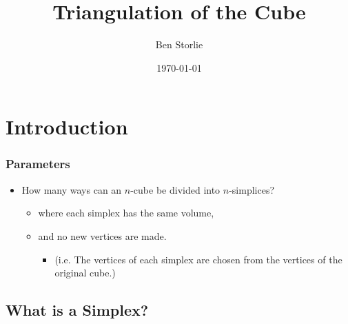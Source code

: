 \documentclass{beamer}
\title{Triangulation of the Cube}
\author{Ben Storlie}
\date{\today}
\begin{document}
\frame{\titlepage}


\section{Introduction}
\frame
{
  \frametitle{Parameters}

  \begin{itemize}
  \item <1-> How many ways can an $n$-cube be divided into $n$-simplices?
  	\begin{itemize}
	\item <2-> where each simplex has the same volume,
	\item <3-> and no new vertices are made.\\
		\begin{itemize}
		\item <4-> (i.e. The vertices of each simplex are chosen from the 				vertices of the original cube.)
		\end{itemize}
	\end{itemize}
  \end{itemize}
}




\subsection{What is a Simplex?}
\end{document}
